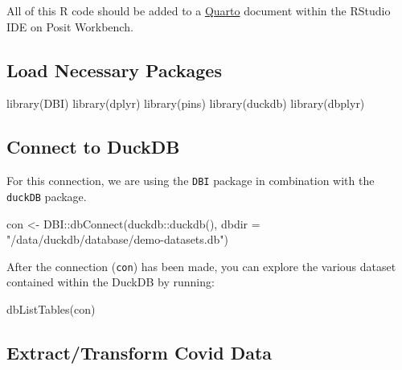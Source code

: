 \documentclass[
  letterpaper,
  DIV=11,
  numbers=noendperiod]{scrreprt}
\newenvironment{Shaded}{\begin{snugshade}}{\end{snugshade}}
\newcommand{\AttributeTok}[1]{\textcolor[rgb]{0.40,0.45,0.13}{#1}}
\newcommand{\FunctionTok}[1]{\textcolor[rgb]{0.28,0.35,0.67}{#1}}
\newcommand{\NormalTok}[1]{\textcolor[rgb]{0.00,0.23,0.31}{#1}}
\newcommand{\OtherTok}[1]{\textcolor[rgb]{0.00,0.23,0.31}{#1}}
\newcommand{\SpecialCharTok}[1]{\textcolor[rgb]{0.37,0.37,0.37}{#1}}
\newcommand{\StringTok}[1]{\textcolor[rgb]{0.13,0.47,0.30}{#1}}
\begin{document}
All of this R code should be added to a
\href{https://quarto.org/}{Quarto} document within the RStudio IDE on
Posit Workbench.

\subsection{Load Necessary Packages}\label{load-necessary-packages}

\begin{Shaded}
\begin{Highlighting}[]
\FunctionTok{library}\NormalTok{(DBI)}
\FunctionTok{library}\NormalTok{(dplyr)}
\FunctionTok{library}\NormalTok{(pins)}
\FunctionTok{library}\NormalTok{(duckdb)}
\FunctionTok{library}\NormalTok{(dbplyr)}
\end{Highlighting}
\end{Shaded}

\subsection{Connect to DuckDB}\label{connect-to-duckdb}

For this connection, we are using the \texttt{DBI} package in
combination with the \texttt{duckDB} package.

\begin{Shaded}
\begin{Highlighting}[]
\NormalTok{con }\OtherTok{\textless{}{-}}\NormalTok{ DBI}\SpecialCharTok{::}\FunctionTok{dbConnect}\NormalTok{(duckdb}\SpecialCharTok{::}\FunctionTok{duckdb}\NormalTok{(), }\AttributeTok{dbdir =} \StringTok{"/data/duckdb/database/demo{-}datasets.db"}\NormalTok{)}
\end{Highlighting}
\end{Shaded}

After the connection (\texttt{con}) has been made, you can explore the
various dataset contained within the DuckDB by running:

\begin{Shaded}
\begin{Highlighting}[]
\FunctionTok{dbListTables}\NormalTok{(con)}
\end{Highlighting}
\end{Shaded}

\subsection{Extract/Transform Covid
Data}\label{extracttransform-covid-data}
\end{document}
